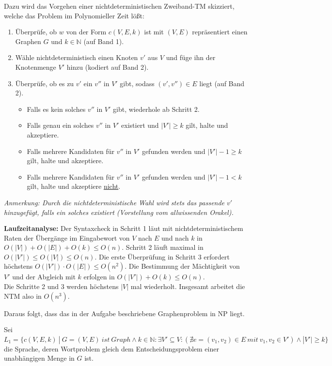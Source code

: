 \begin{teile}
	\item 
	Dazu wird das Vorgehen einer nichtdeterministischen Zweiband-TM skizziert, welche das Problem im Polynomieller Zeit lößt:
	\begin{enumerate}
		\item Überprüfe, ob $w$ von der Form $c(V,E,k)$ ist mit $(V,E)$ repräsentiert einen Graphen $G$ und $k \in \mathbb{N}$ (auf Band 1).
		\item Wähle nichtdeterministisch einen Knoten $v'$ aus $V$ und füge ihn der Knotenmenge $V'$ hinzu (kodiert auf Band 2).
		\item Überprüfe, ob es zu $v'$ ein $v''$ in $V'$ gibt, sodass $(v',v'')\in E$ liegt (auf Band 2). \begin{itemize}
			\item Falls es kein solches $v''$ in $V'$ gibt, wiederhole ab Schritt 2.
			\item Falls genau ein solches $v''$ in $V'$ existiert und $|V'|\geq k$ gilt, halte und akzeptiere.
			\item Falls mehrere Kandidaten für $v''$ in $V'$ gefunden werden und $|V'|-1\geq k$ gilt, halte und akzeptiere.
			\item Falls mehrere Kandidaten für $v''$ in $V'$ gefunden werden und $|V'|-1 < k$ gilt, halte und akzeptiere \underline{nicht}.
		\end{itemize}
	\end{enumerate}
	\textit{Anmerkung: Durch die nichtdeterministische Wahl wird stets das passende $v'$ hinzugefügt, falls ein solches existiert (Vorstellung vom allwissenden Orakel).}

	\textbf{Laufzeitanalyse:} Der Syntaxcheck in Schritt 1 läut mit nichtdeterministischem Raten der Übergänge im Eingabewort von $V$ nach $E$ und nach $k$ in $O(|V|)+O(|E|)+O(k)\leq O(n)$. Schritt 2 läuft maximal in $O(|V'|)\leq O(|V|)\leq O(n)$. Die erste Überprüfung in Schritt 3 erfordert höchstens $O(|V'|)\cdot O(|E|)\leq O(n^2)$. Die Bestimmung der Mächtigkeit von $V'$ und der Abgleich mit $k$ erfolgen in $O(|V'|)+O(k)\leq O(n)$.\\
	Die Schritte 2 und 3 werden höchstens $|V|$ mal wiederholt. Insgesamt arbeitet die NTM also in $O(n^3)$.

	Daraus folgt, dass das in der Aufgabe beschriebene Graphenproblem in NP liegt.

	\item
	Sei	$L_1=\{c(V,E,k)\ |\ G=(V,E)\ ist\ Graph \wedge k\in \mathbb{N}: \exists V' \subseteq V:(\nexists e=(v_1,v_2)\in E\ mit\ v_1,v_2 \in V') \wedge |V'|\geq k \}$\\
	die Sprache, deren Wortproblem gleich dem Entscheidungsproblem einer unabhängigen Menge in $G$ ist.


\end{teile}
